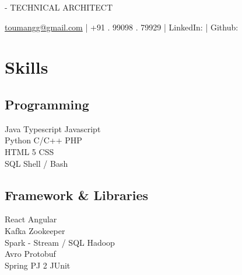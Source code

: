 \documentclass[]{main}
\begin{document}
\lastupdated

 { - TECHNICAL ARCHITECT}
{\href{mailto:toumangg@gmail.com}{toumangg@gmail.com}  |  +91 . 99098 . 79929  | 
LinkedIn: \href{https://www.linkedin.com/in/galaumang}{} | Github: \href{https://github.com/galaumang}{}

}


\begin{minipage}[t]{0.25\textwidth} 



\section{Skills}
\subsection{Programming}\sectionsep
\textbullet{} Java \textbullet{} Typescript \textbullet{} Javascript\\
\textbullet{} Python \textbullet{} C/C++ \textbullet{} PHP\\
\textbullet{} HTML 5 \textbullet{} CSS\\
\textbullet{} SQL \textbullet{} Shell / Bash

\sectionsep
\subsection{Framework \& Libraries}\sectionsep
\textbullet{} React \textbullet{} Angular\\
\textbullet{} Kafka \textbullet{} Zookeeper\\
\textbullet{} Spark - Stream / SQL \textbullet{} Hadoop\\
\textbullet{} Avro \textbullet{} Protobuf\\
\textbullet{} Spring \textbullet{} PJ 2 \textbullet{} JUnit
\sectionsep


\end{minipage}
\end{document}
